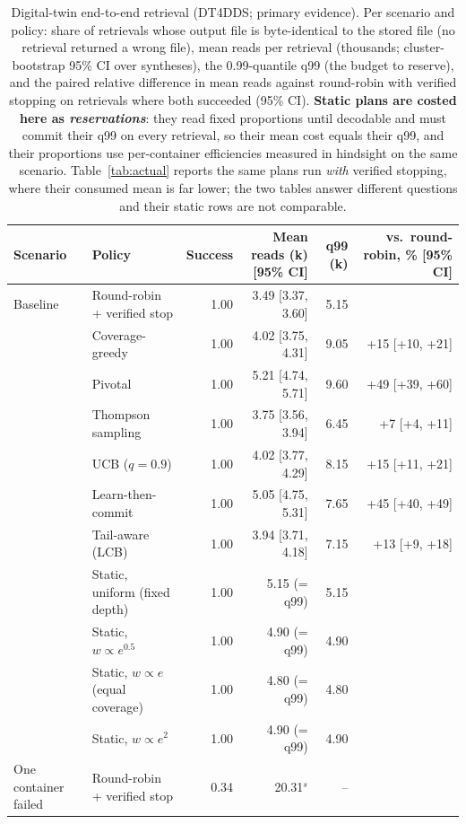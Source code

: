 \begin{table}[!t]
\centering
\caption{Digital-twin end-to-end retrieval (DT4DDS; primary evidence).  Per scenario and policy: share of retrievals whose output file is byte-identical to the stored file (no retrieval returned a wrong file), mean reads per retrieval (thousands; cluster-bootstrap 95\% CI over syntheses), the 0.99-quantile q99 (the budget to reserve), and the paired relative difference in mean reads against round-robin with verified stopping on retrievals where both succeeded (95\% CI).  \textbf{Static plans are costed here as \emph{reservations}}: they read fixed proportions until decodable and must commit their q99 on every retrieval, so their mean cost equals their q99, and their proportions use per-container efficiencies measured in hindsight on the same scenario.  Table~\ref{tab:actual} reports the same plans run \emph{with} verified stopping, where their consumed mean is far lower; the two tables answer different questions and their static rows are not comparable.}
\label{tab:dt}
\scriptsize
\setlength{\tabcolsep}{3pt}
\begin{tabular}{@{}llrrrr@{}}
\toprule
Scenario & Policy & Success & Mean reads (k) [95\% CI] & q99 (k) & vs.\ round-robin, \% [95\% CI] \\
\midrule
Baseline & Round-robin + verified stop & 1.00 & 3.49 [3.37, 3.60] & 5.15 &  \\
 & Coverage-greedy & 1.00 & 4.02 [3.75, 4.31] & 9.05 & +15 [+10, +21] \\
 & Pivotal & 1.00 & 5.21 [4.74, 5.71] & 9.60 & +49 [+39, +60] \\
 & Thompson sampling & 1.00 & 3.75 [3.56, 3.94] & 6.45 & +7 [+4, +11] \\
 & UCB ($q{=}0.9$) & 1.00 & 4.02 [3.77, 4.29] & 8.15 & +15 [+11, +21] \\
 & Learn-then-commit & 1.00 & 5.05 [4.75, 5.31] & 7.65 & +45 [+40, +49] \\
 & Tail-aware (LCB) & 1.00 & 3.94 [3.71, 4.18] & 7.15 & +13 [+9, +18] \\
 & Static, uniform (fixed depth) & 1.00 & 5.15 (= q99) & 5.15 &  \\
 & Static, $w\propto e^{0.5}$ & 1.00 & 4.90 (= q99) & 4.90 &  \\
 & Static, $w\propto e$ (equal coverage) & 1.00 & 4.80 (= q99) & 4.80 &  \\
 & Static, $w\propto e^{2}$ & 1.00 & 4.90 (= q99) & 4.90 &  \\
\midrule
One container failed & Round-robin + verified stop & 0.34 & 20.31$^{s}$ & -- &  \\

\end{tabular}
\end{table}
